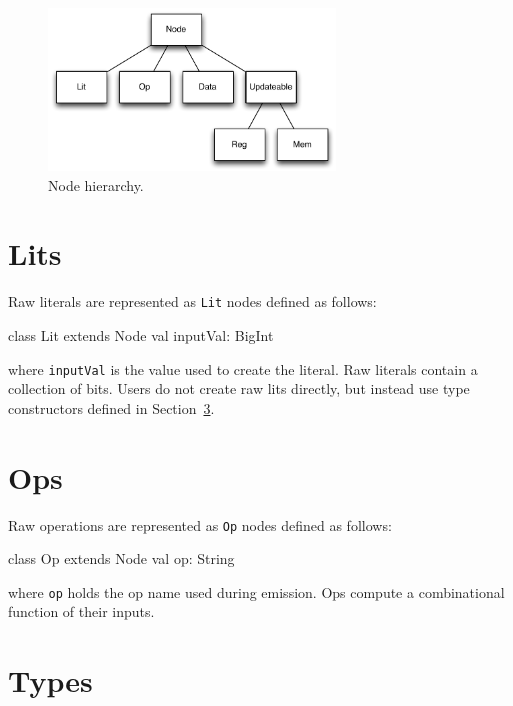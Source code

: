 \documentclass[10pt,twocolumn]{article}
\def\code#1{{\small\tt #1}}
\begin{document}
\begin{figure}[h]
\centering
\includegraphics[width=3in]{figs/node-hierarchy.pdf}
\caption{Node hierarchy.}
\label{fig:node-hierarchy}
\end{figure}

\section{Lits}

Raw literals are represented as \code{Lit} nodes defined as follows:

\begin{scala}
class Lit extends Node {
  val inputVal: BigInt
}
\end{scala}

\noindent
where \code{inputVal} is the value used to create the literal.  
Raw literals contain a collection of bits.  
Users do not create raw lits directly, but instead use type
constructors defined in Section~\ref{sec:types}.



\section{Ops}

Raw operations are represented as \code{Op} nodes defined as follows:

\begin{scala}
class Op extends Node {
  val op: String
}
\end{scala}

\noindent
where \code{op} holds the op name used during emission.  
Ops compute a combinational function of their inputs.

\section{Types}
\label{sec:types}
\end{document}

